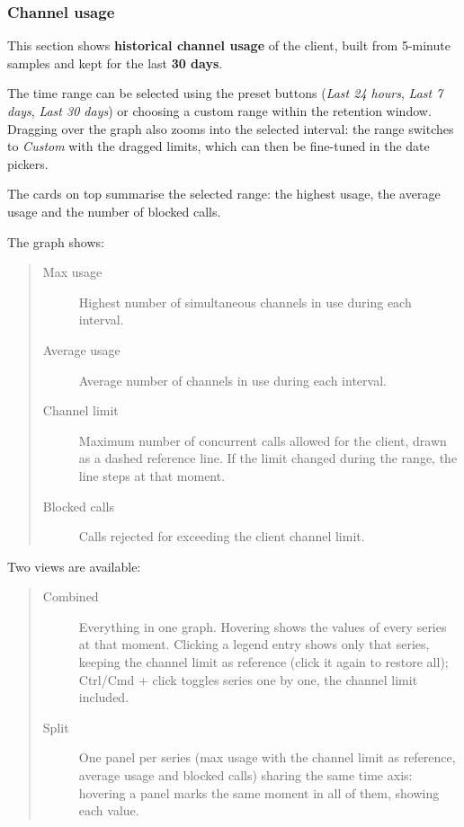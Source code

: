 \documentclass[letterpaper,10pt,english]{sphinxmanual}
\begin{document}
\subsubsection{Channel usage}
\label{administration_portal/client/vpbx/calls/channel_usage:channel-usage}\label{administration_portal/client/vpbx/calls/channel_usage::doc}
This section shows \textbf{historical channel usage} of the client, built from 5-minute samples and kept for the last
\textbf{30 days}.

The time range can be selected using the preset buttons (\emph{Last 24 hours}, \emph{Last 7 days}, \emph{Last 30 days}) or choosing
a custom range within the retention window. Dragging over the graph also zooms into the selected interval: the range
switches to \emph{Custom} with the dragged limits, which can then be fine-tuned in the date pickers.

The cards on top summarise the selected range: the highest usage, the average usage and the number of blocked calls.

The graph shows:
\begin{quote}
\begin{description}
\item[{Max usage}] \leavevmode
Highest number of simultaneous channels in use during each interval.

\item[{Average usage}] \leavevmode
Average number of channels in use during each interval.

\item[{Channel limit}] \leavevmode
Maximum number of concurrent calls allowed for the client, drawn as a dashed reference line. If the limit
changed during the range, the line steps at that moment.

\item[{Blocked calls}] \leavevmode
Calls rejected for exceeding the client channel limit.

\end{description}
\end{quote}

Two views are available:
\begin{quote}
\begin{description}
\item[{Combined}] \leavevmode
Everything in one graph. Hovering shows the values of every series at that moment. Clicking a legend entry
shows only that series, keeping the channel limit as reference (click it again to restore all); Ctrl/Cmd +
click toggles series one by one, the channel limit included.

\item[{Split}] \leavevmode
One panel per series (max usage with the channel limit as reference, average usage and blocked calls) sharing
the same time axis: hovering a panel marks the same moment in all of them, showing each value.

\end{description}
\end{quote}
\end{document}
